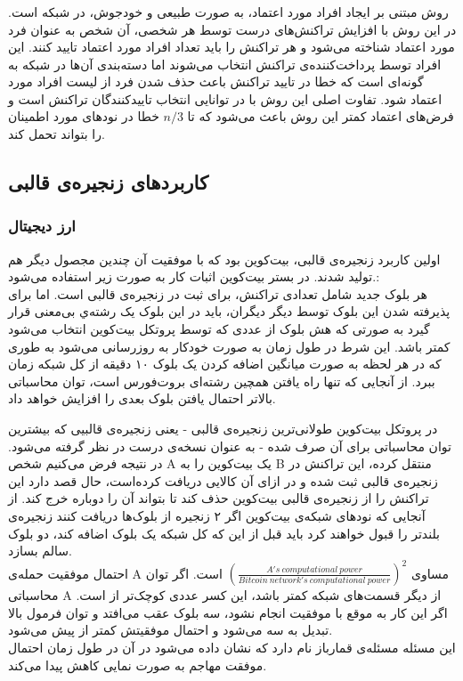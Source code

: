 \subsubsection{}
 روش 
\cite{scp}
 مبتنی بر ایجاد افراد مورد اعتماد، به صورت طبیعی و خودجوش، در شبکه است. در این روش با افزایش تراکنش‌های درست توسط هر شخصی، آن شخص به عنوان فرد مورد اعتماد شناخته می‌شود و هر تراکنش را باید تعداد افراد مورد اعتماد تایید کنند. این افراد توسط پرداخت‌کننده‌ی تراکنش انتخاب می‌شوند اما دسته‌بندی آن‌ها در شبکه‌ به گونه‌ای است که خطا در تایید تراکنش باعث حذف شدن فرد از لیست افراد مورد اعتماد شود. تفاوت اصلی این روش با 
 در توانایی انتخاب تاییدکنندگان تراکنش است و فرض‌های اعتماد کمتر این روش باعث می‌شود که تا $ n /3 $ خطا در نود‌های مورد اطمینان را بتواند تحمل کند.



\subsection{کاربرد‌های زنجیره‌ی قالبی}
\subsubsection{ارز دیجیتال}
اولین کاربرد زنجیره‌ی قالبی، بیت‌کوین بود که با موفقیت آن چندین مجصول دیگر هم تولید شدند. 
در بستر بیت‌کوین اثبات کار به صورت زیر استفاده می‌شود.:
\\
هر بلوک جدید شامل تعدادی تراکنش، برای ثبت در زنجیره‌ی قالبی است. اما برای پذیرفته شدن این بلوک توسط دیگر دیگران، باید در این بلوک یک رشته‌ي بی‌معنی 
قرار گیرد به صورتی که هش بلوک از عددی که توسط پروتکل بیت‌کوین انتخاب می‌شود کمتر باشد. این شرط در طول زمان به صورت خودکار به روزرسانی می‌شود به طوری که در هر لحظه به صورت میانگین اضافه کردن یک بلوک ۱۰ دقیقه از کل شبکه زمان ببرد. از آنجایی که تنها راه یافتن همچین رشته‌ای بروت‌فورس
است، توان محاسباتی بالاتر احتمال یافتن بلوک بعدی را افزایش خواهد داد. 
\par
در پروتکل بیت‌کوین طولانی‌ترین زنجیره‌ی قالبی - یعنی زنجیره‌ی قالبیی که بیشترین توان محاسباتی برای آن صرف شده - به عنوان نسخه‌ی درست در نظر گرفته می‌شود. در نتیجه 
فرض می‌کنیم شخص A یک بیت‌کوین را به B منتقل کرده، این تراکنش در زنجیره‌ی قالبی ثبت شده و در ازای آن کالایی دریافت کرده‌است، حال قصد دارد این تراکنش را از زنجیره‌ی قالبی بیت‌کوین حذف کند تا بتواند آن را دوباره خرج کند. از آنجایی که نود‌های شبکه‌ی بیت‌کوین اگر ۲ زنجیره از بلوک‌ها دریافت کنند زنجیره‌ی بلند‌تر را قبول خواهند کرد باید قبل از این که کل شبکه یک بلوک  اضافه کند، دو بلوک سالم بسازد.
\\
احتمال موفقیت حمله‌ی A مساوی
$(\frac{A's\ computational\ power}{Bitcoin\ network's\ computational\ power}) ^ 2 $
است. اگر توان محاسباتی A از دیگر قسمت‌های شبکه کمتر باشد، این کسر عددی کوچک‌تر از 
است. اگر این کار به موقع با موفقیت انجام نشود، سه بلوک عقب می‌افتد و توان فرمول بالا تبدیل به سه می‌شود و احتمال موفقیتش کمتر از پیش می‌شود. 
\\
این مسئله مسئله‌ی قمارباز
نام دارد که نشان داده می‌شود در آن در طول زمان احتمال موفقت مهاجم به صورت نمایی کاهش پیدا می‌کند.
\par

